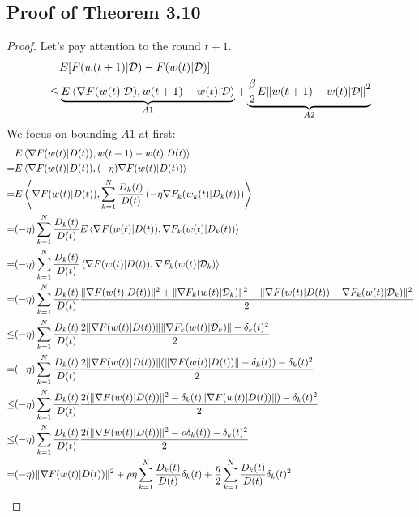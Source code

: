 \documentclass{article}
\theoremstyle{plain}
\theoremstyle{definition}
\theoremstyle{remark}
\begin{document}
\subsection{Proof of Theorem 3.10}
\begin{proof}
  Let's pay attention to the round $t+1$.
  \begin{align}
         & E[F(w(t+1)|\mathcal{D})-F(w(t)|\mathcal{D})] \notag \\
    \leq & \underbrace{E\left\langle \nabla F(w(t)|\mathcal{D}), w(t+1)-w(t)|\mathcal{D}\right\rangle}_{A1} + \underbrace{\frac{\beta}{2}E{\Vert w(t+1)-w(t)|\mathcal{D} \Vert}^2}_{A2} \\
  \end{align}
  We focus on bounding $A1$ at first:
  \begin{align}
         & E\left\langle \nabla F(w(t)|D(t)), w(t+1) - w(t) | D(t)\right\rangle \notag \\
    =    & E\left\langle \nabla F(w(t)|D(t)), (-\eta)\nabla F(w(t)|D(t))\right\rangle \notag \\ 
    =    & E\left\langle \nabla F(w(t)|D(t)), \sum_{k=1}^{N} \frac{D_k(t)}{D(t)} \left(-\eta\nabla F_k(w_k(t)|D_k(t))\right) \right\rangle \notag \\
    =    & (-\eta)\sum_{k=1}^{N} \frac{D_k(t)}{D(t)}E\left\langle\nabla F(w(t)|D(t)), \nabla F_k(w(t)|D_k(t))\right\rangle \notag \\    
    =    & (-\eta)\sum_{k=1}^{N} \frac{D_k(t)}{D(t)}\left\langle\nabla F(w(t)|D(t)), \nabla F_k(w(t)|\mathcal{D}_k)\right\rangle \notag \\
    =    & (-\eta)\sum_{k=1}^{N} \frac{D_k(t)}{D(t)}\frac{\Vert\nabla F(w(t)|D(t))\Vert^2 + \Vert \nabla F_k(w(t)|\mathcal{D}_k)\Vert^2 - \Vert\nabla F(w(t)|D(t)) - \nabla F_k(w(t)|\mathcal{D}_k)\Vert^2}{2} \notag \\
    \leq & (-\eta)\sum_{k=1}^{N} \frac{D_k(t)}{D(t)}\frac{2\Vert\nabla F(w(t)|D(t))\Vert\Vert\nabla F_k(w(t)|\mathcal{D}_k)\Vert - \delta_k(t)^2}{2} \notag \\
    =    & (-\eta)\sum_{k=1}^{N} \frac{D_k(t)}{D(t)}\frac{2\Vert\nabla F(w(t)|D(t))\Vert(\Vert\nabla F(w(t)|D(t))\Vert - \delta_k(t)) - \delta_k(t)^2}{2} \notag \\
    \leq & (-\eta)\sum_{k=1}^{N} \frac{D_k(t)}{D(t)}\frac{2(\Vert\nabla F(w(t)|D(t))\Vert^2 - \delta_k(t)\Vert\nabla F(w(t)|D(t))\Vert) - \delta_k(t)^2}{2} \notag \\
    \leq & (-\eta)\sum_{k=1}^{N} \frac{D_k(t)}{D(t)}\frac{2(\Vert\nabla F(w(t)|D(t))\Vert^2 - \rho \delta_k(t)) - \delta_k(t)^2}{2} \notag \\
    =    & (-\eta) \Vert \nabla F(w(t)|D(t))\Vert^2 + \rho \eta \sum_{k=1}^{N} \frac{D_k(t)}{D(t)} \delta_k(t) + \frac{\eta}{2}\sum_{k=1}^{N} \frac{D_k(t)}{D(t)} \delta_k(t)^2
  \end{align}
  

\end{proof}
\end{document}
